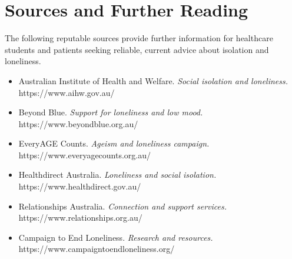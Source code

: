 \section*{Sources and Further Reading}
The following reputable sources provide further information for healthcare students and patients seeking reliable, current advice about isolation and loneliness.
\begin{itemize}
    \item Australian Institute of Health and Welfare. \textit{Social isolation and loneliness.} https://www.aihw.gov.au/
    \item Beyond Blue. \textit{Support for loneliness and low mood.} https://www.beyondblue.org.au/
    \item EveryAGE Counts. \textit{Ageism and loneliness campaign.} https://www.everyagecounts.org.au/
    \item Healthdirect Australia. \textit{Loneliness and social isolation.} https://www.healthdirect.gov.au/
    \item Relationships Australia. \textit{Connection and support services.} https://www.relationships.org.au/
    \item Campaign to End Loneliness. \textit{Research and resources.} https://www.campaigntoendloneliness.org/
\end{itemize}
